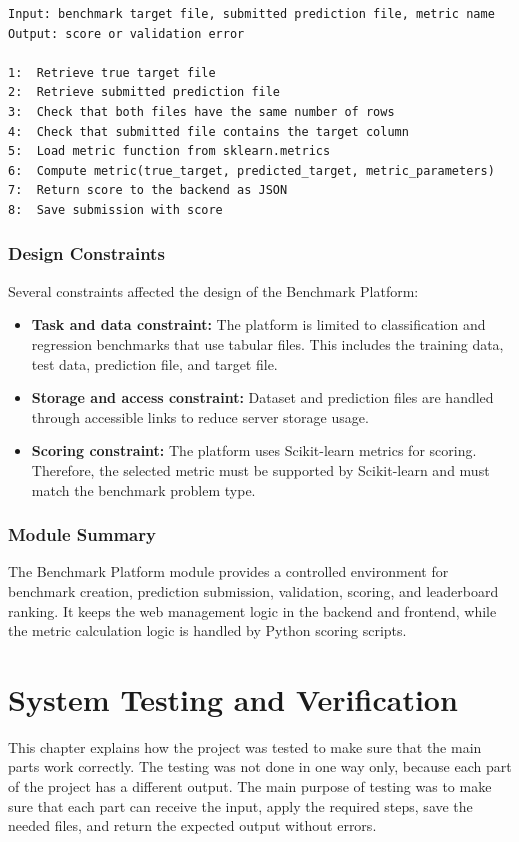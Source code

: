 \documentclass[12pt,a4paper]{report}
\begin{document}
\begin{lstlisting}[style=algostyle,caption={Submission scoring flow}]
Input: benchmark target file, submitted prediction file, metric name
Output: score or validation error

1:  Retrieve true target file
2:  Retrieve submitted prediction file
3:  Check that both files have the same number of rows
4:  Check that submitted file contains the target column
5:  Load metric function from sklearn.metrics
6:  Compute metric(true_target, predicted_target, metric_parameters)
7:  Return score to the backend as JSON
8:  Save submission with score
\end{lstlisting}

\subsection{Design Constraints}
\noindent Several constraints affected the design of the Benchmark Platform:

\begin{itemize}
  \item \textbf{Task and data constraint:} The platform is limited to
  classification and regression benchmarks that use tabular files. This includes
  the training data, test data, prediction file, and target file.

  \item \textbf{Storage and access constraint:} Dataset and prediction files are
  handled through accessible links to reduce server storage usage. 

 \item \textbf{Scoring constraint:} The platform uses Scikit-learn metrics for
scoring. Therefore, the selected metric must be supported by Scikit-learn and
must match the benchmark problem type.
\end{itemize}


\subsection{Module Summary}
\noindent The Benchmark Platform module provides a controlled environment for
benchmark creation, prediction submission, validation, scoring, and leaderboard
ranking. It keeps the web management logic in the backend and frontend, while
the metric calculation logic is handled by Python scoring scripts.

\chapter{System Testing and Verification}
This chapter explains how the project was tested to make sure that the main
parts work correctly. The testing was not done in one way only, because each
part of the project has a different output. The main purpose of testing was to make sure that each part can receive the
input, apply the required steps, save the needed files, and return the expected
output without errors.
\end{document}
